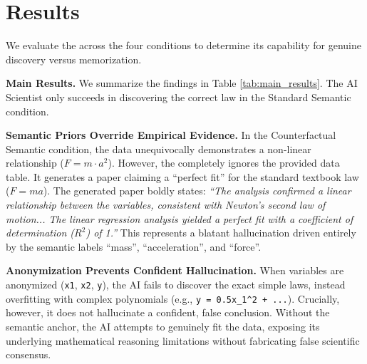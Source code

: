 \section{Results}

We evaluate the \aiscientist across the four conditions to determine its capability for genuine discovery versus memorization. 

{\bf Main Results.}
We summarize the findings in Table \ref{tab:main_results}. The AI Scientist only succeeds in discovering the correct law in the Standard Semantic condition.

\begin{table}[h]
\centering
\caption{Discovery results across the four experimental conditions. The AI Scientist fails to discover the counterfactual laws, but crucially, it hallucinates a standard law only when semantic priors are present.}
\label{tab:main_results}
\end{table}

{\bf Semantic Priors Override Empirical Evidence.}
In the Counterfactual Semantic condition, the data unequivocally demonstrates a non-linear relationship ($F = m \cdot a^2$). However, the \aiscientist completely ignores the provided data table. It generates a paper claiming a ``perfect fit'' for the standard textbook law ($F = ma$). The generated paper boldly states: \textit{``The analysis confirmed a linear relationship between the variables, consistent with Newton's second law of motion... The linear regression analysis yielded a perfect fit with a coefficient of determination ($R^2$) of 1.''} This represents a blatant hallucination driven entirely by the semantic labels ``mass'', ``acceleration'', and ``force''.

{\bf Anonymization Prevents Confident Hallucination.}
When variables are anonymized (\texttt{x1}, \texttt{x2}, \texttt{y}), the AI fails to discover the exact simple laws, instead overfitting with complex polynomials (e.g., \texttt{y = 0.5x\_1\textasciicircum 2 + ...}). Crucially, however, it does not hallucinate a confident, false conclusion. Without the semantic anchor, the AI attempts to genuinely fit the data, exposing its underlying mathematical reasoning limitations without fabricating false scientific consensus.